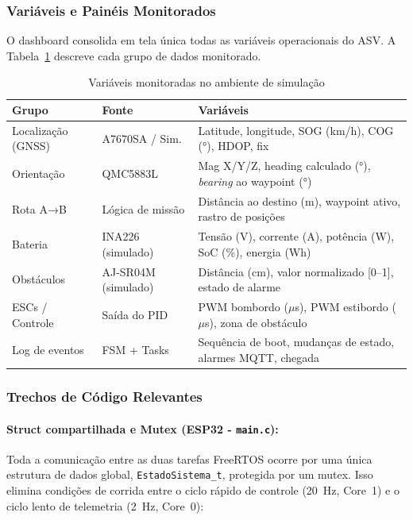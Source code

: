 \documentclass[12pt,a4paper]{article}
\begin{document}
\subsubsection{Variáveis e Painéis Monitorados}

O dashboard consolida em tela única todas as variáveis operacionais do ASV. A Tabela~\ref{tab:variaveis_sim} descreve cada grupo de dados monitorado.

\begin{table}[H]
\centering
\caption{Variáveis monitoradas no ambiente de simulação}
\label{tab:variaveis_sim}
\renewcommand{\arraystretch}{1.3}
\begin{tabularx}{\textwidth}{|l|l|X|}
\hline
\rowcolor{gray!20}
\textbf{Grupo} & \textbf{Fonte} & \textbf{Variáveis} \\ \hline
Localização (GNSS) & A7670SA / Sim. & Latitude, longitude, SOG (km/h), COG (°), HDOP, fix \\ \hline
\rowcolor{gray!10}
Orientação & QMC5883L & Mag X/Y/Z, heading calculado (°), \textit{bearing} ao waypoint (°) \\ \hline
Rota A→B & Lógica de missão & Distância ao destino (m), waypoint ativo, rastro de posições \\ \hline
\rowcolor{gray!10}
Bateria & INA226 (simulado) & Tensão (V), corrente (A), potência (W), SoC (\%), energia (Wh) \\ \hline
Obstáculos & AJ-SR04M (simulado) & Distância (cm), valor normalizado [0--1], estado de alarme \\ \hline
\rowcolor{gray!10}
ESCs / Controle & Saída do PID & PWM bombordo ($\mu$s), PWM estibordo ($\mu$s), zona de obstáculo \\ \hline
Log de eventos & FSM + Tasks & Sequência de boot, mudanças de estado, alarmes MQTT, chegada \\ \hline
\end{tabularx}
\end{table}

\subsubsection{Trechos de Código Relevantes}

\paragraph{Struct compartilhada e Mutex (ESP32 - \texttt{main.c}):}
Toda a comunicação entre as duas tarefas FreeRTOS ocorre por uma única estrutura de dados global, \texttt{EstadoSistema\_t}, protegida por um mutex. Isso elimina condições de corrida entre o ciclo rápido de controle (20~Hz, Core~1) e o ciclo lento de telemetria (2~Hz, Core~0):
\end{document}
